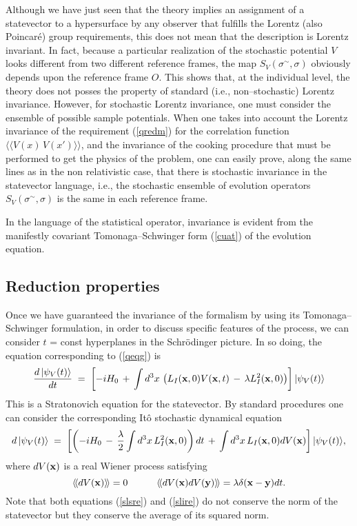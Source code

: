 \documentclass[10pt,a4paper]{article}
\newcommand{\llangle}{\langle\!\langle}
\newcommand{\rrangle}{\rangle\!\rangle}
\begin{document}
Although we have just seen that the theory implies an assignment
of a statevector to a hypersurface by any observer that fulfills
the Lorentz (also Poincar\'e) group requirements, this does not
mean that the description is Lorentz invariant. In fact, because a
particular realization of the stochastic potential $V$ looks
different from two different reference frames, the map
$S_{V}(\sigma{}^{\sim}, \sigma)$ obviously depends upon the
reference frame $O$. This shows that, at the individual level, the
theory does not posses the property of standard (i.e.,
non--stochastic) Lorentz invariance. However, for stochastic
Lorentz invariance, one must consider the ensemble of possible
sample potentials. When one takes into account the Lorentz
invariance of the requirement (\ref{qredm}) for the correlation
function $\llangle V(x)\, V(x') \rrangle$, and the invariance of
the cooking procedure that must be performed to get the physics of
the problem, one can easily prove, along the same lines as in the
non relativistic case, that there is stochastic invariance in the
statevector language, i.e., the stochastic ensemble of evolution
operators $S_{V}(\sigma{}^{\sim}, \sigma)$ is the same in each
reference frame.

In the language of the statistical operator, invariance is evident
from the manifestly covariant Tomonaga--Schwinger form
(\ref{cuat}) of the evolution equation.

\subsection{Reduction properties} \label{sec95}

Once we have guaranteed the invariance of the formalism by using
its Tomonaga--Schwinger formulation, in order to discuss specific
features of the process, we can consider $t$ = const hyperplanes
in the Schr\"odinger picture. In so doing, the equation
corresponding to (\ref{qeqg}) is
\begin{equation} \label{slsre}
\frac{d\,|\psi_{V}(t)\rangle}{dt}\; = \; \left[ -i H_{0}\, + \,
\int d^{3}x\, \left( L_{I}({\bf x}, 0) V({\bf x}, t) \, - \,
\lambda L_{I}^{2}({\bf x}, 0) \right)\right] |\psi_{V}(t)\rangle
\end{equation}
This is a Stratonovich equation for the statevector. By standard
procedures one can consider the corresponding It\^o stochastic
dynamical equation
\begin{equation} \label{slire}
d\,|\psi_{V}(t)\rangle\; = \; \left[\left( -i H_{0}\, - \,
\frac{\lambda}{2}\int d^{3}x\, L_{I}^{2}({\bf x}, 0) \right) dt \,
+ \, \int d^{3}x\, L_{I}({\bf x}, 0) dV({\bf x}) \right]
|\psi_{V}(t)\rangle,
\end{equation}
where $dV({\bf x})$ is a real Wiener process satisfying
\begin{equation}
\llangle dV({\bf x}) \rrangle = 0 \qquad\quad \llangle dV({\bf x})
dV({\bf y}) \rrangle = \lambda \delta({\bf x} - {\bf y}) dt.
\end{equation}
Note that both equations (\ref{slsre}) and (\ref{slire}) do not
conserve the norm of the statevector but they conserve the average
of its squared norm.
\end{document}
